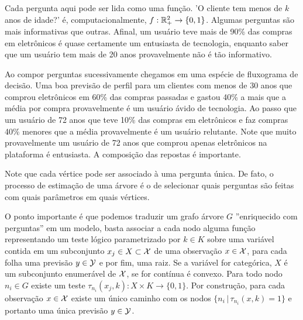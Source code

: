 \begin{exemplo}
Cada pergunta aqui pode ser lida como uma função. 'O cliente tem menos de $k$ anos de idade?' é, computacionalmente,  $f: \mathbb{R}^2_+ \to \{0, 1\}$. Algumas perguntas são mais informativas que outras. Afinal, um usuário teve mais de 90\% das compras em eletrônicos é quase certamente um entusiasta de tecnologia, enquanto saber que um usuário tem mais de 20 anos provavelmente não é tão informativo. 

Ao compor perguntas sucessivamente chegamos em uma espécie de fluxograma de decisão. Uma boa previsão de perfil para um clientes com menos de 30 anos que comprou eletrônicos em 60\% das compras passadas e gastou 40\% a mais que a média por compra provavelmente é um usuário ávido de tecnologia. Ao passo que um usuário de 72 anos que teve 10\% das compras em eletrônicos e faz compras 40\% menores que a média provavelmente é um usuário relutante. Note que muito provavelmente um usuário de 72 anos que comprou apenas eletrônicos na plataforma é entusiasta. A composição das repostas é importante.

Note que cada vértice pode ser associado à uma pergunta única. De fato, o processo de estimação de uma árvore é o de selecionar quais perguntas são feitas com quais parâmetros em quais vértices. 
\end{exemplo}

O ponto importante é que podemos traduzir um grafo árvore $G$ ''enriquecido com perguntas'' em um modelo, basta associar a cada nodo alguma função representando um teste lógico parametrizado por $k \in K$ sobre uma variável contida em um subconjunto $x_j \in X \subset \mathcal{X}$ de uma observação $x \in \mathcal{X}$, para cada folha uma previsão $y \in \mathcal{Y}$ e por fim, uma raiz. Se a variável for categórica, $X$ é um subconjunto enumerável de $\mathcal{X}$, se for contínua é convexo. Para todo nodo $n_i \in G$ existe um teste $\tau_{n_i}(x_j, k) : X  \times K \to \{0, 1\}$. Por construção, para cada observação $x \in \mathcal{X}$ existe um único caminho com os nodos $ \{n_i \, | \, \tau_{n_i}(x, k) = 1\}$ e portanto uma única previsão $y \in \mathcal{Y}$. 


